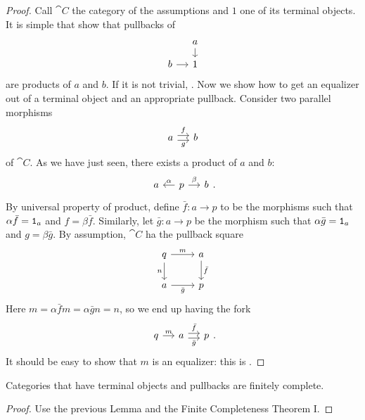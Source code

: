 \begin{proof}
Call \(\cat C\) the category of the assumptions and \(1\) one of its terminal objects. It is simple that show that pullbacks of
\[\begin{tikzcd}[sep=small]
& a \ar[d] \\
b \ar[r] & 1
\end{tikzcd}\]
are products of \(a\) and \(b\). If it is not trivial, . Now we show how to get an equalizer out of a terminal object and an appropriate pullback. Consider two parallel morphisms
\[\begin{tikzcd}[sep=small]
a \ar["f", r, shift left] \ar["g", r, shift right, swap] & b
\end{tikzcd}\]
of \(\cat C\). As we have just seen, there exists a product of \(a\) and \(b\):
\[\begin{tikzcd}[sep=small] a & p \ar["\alpha", l, swap] \ar["\beta", r] & b \end{tikzcd}.\]
By universal property of product, define \(\bar f : a \to p\) to be the morphisms such that \(\alpha \bar f = \mathtt 1_a\) and \(f = \beta \bar f\). Similarly, let \(\bar g : a \to p\) be the morphism such that \(\alpha \bar g = \mathtt 1_a\) and \(g = \beta \bar g\). By assumption, \(\cat C\) ha the pullback square
\[\begin{tikzcd}
q \ar["m", r] \ar["n", d, swap] & a \ar["{\bar f}", d] \\
a \ar["{\bar g}", r, swap] & p
\end{tikzcd}\]
Here \(m = \alpha \bar f m = \alpha \bar g n = n\), so we end up having the fork
\[\begin{tikzcd}[sep=small]
q \ar["m", r] & a \ar["{\bar f}", r, shift left] \ar["{\bar g}", r, shift right, swap] & p
\end{tikzcd} .\]
It should be easy to show that \(m\) is an equalizer: this is .
\end{proof}

\begin{proposition}
Categories that have terminal objects and pullbacks are finitely complete.
\end{proposition}

\begin{proof}
Use the previous Lemma and the Finite Completeness Theorem I.
\end{proof}




